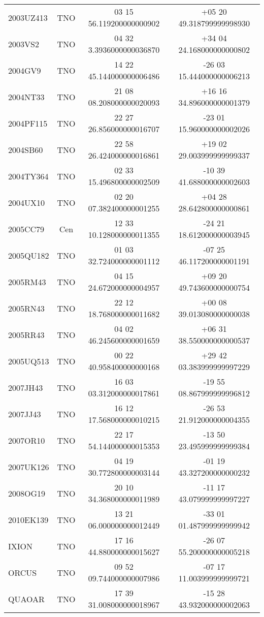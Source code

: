 \documentclass[a4paper, 11pt]{article}
\begin{document}
\begin{table}[!h]
\begin{center}
{\begin{tabular}{|l|c|c|c|}
2003UZ413   &  TNO &  03 15 56.119200000000902 & +05 20 49.318799999998930 \\
2003VS2     &  TNO &  04 32 3.3936000000036870 & +34 04 24.168000000000802 \\
2004GV9     &  TNO &  14 22 45.144000000006486 & -26 03 15.444000000006213 \\
2004NT33    &  TNO &  21 08 08.208000000020093 & +16 16 34.896000000001379 \\
2004PF115   &  TNO &  22 27 26.856000000016707 & -23 01 15.960000000002026 \\
2004SB60    &  TNO &  22 58 26.424000000016861 & +19 02 29.003999999999337 \\
2004TY364   &  TNO &  02 33 15.496800000002509 & -10 39 41.688000000002603 \\
2004UX10    &  TNO &  02 20 07.382400000001255 & +04 28 28.642800000000861 \\
2005CC79    &  Cen &  12 33 10.128000000011355 & -24 21 18.612000000003945 \\
2005QU182   &  TNO &  01 03 32.724000000001112 & -07 25 46.117200000001191 \\
2005RM43    &  TNO &  04 15 24.672000000004957 & +09 20 49.743600000000754 \\
2005RN43    &  TNO &  22 12 18.768000000011682 & +00 08 39.013080000000038 \\
2005RR43    &  TNO &  04 02 46.245600000001659 & +06 31 38.550000000000537 \\
2005UQ513   &  TNO &  00 22 40.958400000000168 & +29 42 03.383999999997229 \\
2007JH43    &  TNO &  16 03 03.312000000017861 & -19 55 08.867999999996812 \\
2007JJ43    &  TNO &  16 12 17.568000000010215 & -26 53 21.912000000004355 \\
2007OR10    &  TNO &  22 17 54.144000000015353 & -13 50 23.495999999999384 \\
2007UK126   &  TNO &  04 19 30.772800000003144 & -01 19 43.327200000000232 \\
2008OG19    &  TNO &  20 10 34.368000000011989 & -11 17 43.079999999997227 \\
2010EK139   &  TNO &  13 21 06.000000000012449 & -33 01 01.487999999999942 \\
IXION       &  TNO &  17 16 44.880000000015627 & -26 07 55.200000000005218 \\
ORCUS       &  TNO &  09 52 09.744000000007986 & -07 17 11.003999999999721 \\
QUAOAR      &  TNO &  17 39 31.008000000018967 & -15 28 43.932000000002063 \\
\hline

\end{tabular}}
\end{center}
\end{table}
\end{document}
